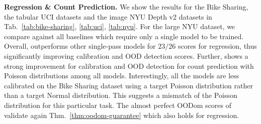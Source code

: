 \textbf{Regression \& Count Prediction.} We show the results for the Bike Sharing, the tabular UCI datasets and the image NYU Depth v2 datasets in Tab.~\ref{tab:bike-sharing}, \ref{tab:uci}, \ref{tab:nyu}. For the large NYU dataset, we compare against all baselines which require only a single model to be trained. Overall, \NatPNacro{} outperforms other single-pass models for $23/26$ scores for regression, thus significantly improving calibration and OOD detection scores. Further, \NatPNacro{} shows a strong improvement for calibration and OOD detection for count prediction with Poisson distributions among all models. Interestingly, all the models are less calibrated on the Bike Sharing dataset using a target Poisson distribution rather than a target Normal distribution. This suggests a mismatch of the Poisson distribution for this particular task. The almost perfect OODom scores of \NatPNacro{} validate again Thm.~\ref{thm:oodom-guarantee} which also holds for regression.

\begin{table}
\vspace{-0mm}
	\centering
    \caption{Batched Inference Time (in ms), NVIDIA GTX 1080 Ti}
\label{tab:inference-time}
\vspace{-3mm}
\vspace{-3mm}
\end{table}

